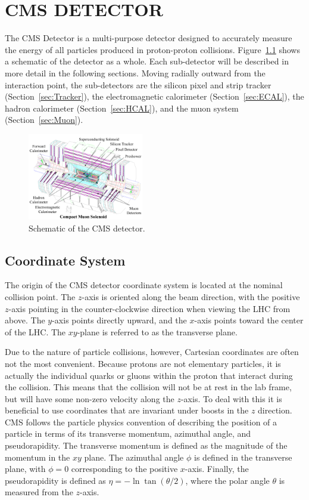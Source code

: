 \chapter{CMS DETECTOR}
\label{chap:Detector}

The CMS Detector is a multi-purpose detector designed to accurately measure the energy of all particles produced in proton-proton collisions. Figure~\ref{fig:CMS}  shows a schematic of the detector as a whole. Each sub-detector will be described in more detail in the following sections. Moving radially outward from the interaction point, the sub-detectors are the silicon pixel and strip tracker (Section~\ref{sec:Tracker}), the electromagnetic calorimeter (Section~\ref{sec:ECAL}), the hadron calorimeter (Section~\ref{sec:HCAL}), and the muon system (Section~\ref{sec:Muon}). 

\begin{figure}[h!]
	\centering
	\includegraphics[width=0.45\textwidth]{Figures/Detector/cms_labelled.pdf}
         \caption{Schematic of the CMS detector.
	}
    	\label{fig:CMS}
\end{figure}

\section{Coordinate System}
\label{sec:coordinates}
The origin of the CMS detector coordinate system is located at the nominal collision point. The $z$-axis is oriented along the beam direction, with the positive $z$-axis pointing in the counter-clockwise direction when viewing the LHC from above. The $y$-axis points directly upward, and the $x$-axis points toward the center of the LHC. The $xy$-plane is referred to as the transverse plane.

Due to the nature of particle collisions, however, Cartesian coordinates are often not the most convenient. Because protons are not elementary particles, it is actually the individual quarks or gluons within the proton that interact during the collision. This means that the collision will not be at rest in the lab frame, but will have some non-zero velocity along the $z$-axis. To deal with this it is beneficial to use coordinates that are invariant under boosts in the $z$ direction. CMS follows the particle physics convention of describing the position of a particle in terms of its transverse momentum, azimuthal angle, and pseudorapidity. The transverse momentum \pt is defined as the magnitude of the momentum in the $xy$ plane. The azimuthal angle $\phi$ is defined in the transverse plane, with $\phi  = 0$ corresponding to the positive $x$-axis. Finally, the pseudorapidity is defined as $\eta = -\ln{\tan{ (\theta / 2 )} } $, where the polar angle $\theta$ is measured from the $z$-axis.

